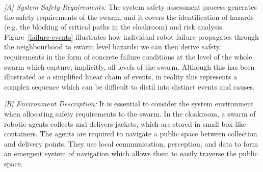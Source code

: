 \documentclass[runningheads]{llncs}
\begin{document}
\emph{[A] System Safety Requirements:}
The system safety assessment process generates the safety requirements of the swarm, and it covers the identification of hazards (e.g. the blocking of critical paths in the cloakroom) and risk analysis.
Figure~\ref{failure-events} illustrates how individual robot failure propagates through the neighbourhood to swarm level hazards: we can then derive safety requirements in the form of concrete failure conditions at the level of the whole swarm which capture, implicitly, all levels of the swarm. 
Although this has been illustrated as a simplified linear chain of events, in reality this represents a complex sequence which can be difficult to distil into distinct events and causes. 

\emph{[B] Environment Description:}
It is essential to consider the system environment when allocating safety requirements to the swarm. 
In the cloakroom, a swarm of robotic agents collects and delivers jackets, which are stored in small box-like containers. 
The agents are required to navigate a public space between collection and delivery points. They use local communication, perception, and data to form an emergent system of navigation which allows them to easily traverse the public space. 

\end{document}
